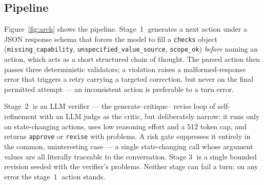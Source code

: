 \documentclass{article}
\begin{document}
\subsection{Pipeline}

Figure~\ref{fig:arch} shows the pipeline. Stage~\textcircled{1}
generates a next action under a JSON response schema
\cite{willard2023guided} that forces the
model to fill a \texttt{checks} object (\texttt{missing\_capability},
\texttt{unspecified\_value\_source}, \texttt{scope\_ok}) \emph{before}
naming an action, which acts as a short structured chain of thought.
The parsed action then passes three deterministic validators; a
violation raises a malformed-response error that triggers a retry
carrying a targeted correction, but never on the final permitted
attempt --- an inconsistent action is preferable to a turn error.

Stage~\textcircled{2} is an LLM verifier --- the generate--critique--%
revise loop of self-refinement
\cite{madaan2023selfrefine,shinn2023reflexion} with an LLM judge
\cite{zheng2023judging} as the critic, but deliberately narrow: it runs
only on state-changing actions, uses low reasoning effort and a 512
token cap, and returns \texttt{approve} or \texttt{revise} with
problems. A risk gate suppresses it entirely in the common,
uninteresting case --- a single state-changing call whose argument
values are all literally traceable to the conversation. Stage
\textcircled{3} is a single bounded revision seeded with the verifier's
problems. Neither stage can fail a turn: on any error the
stage~\textcircled{1} action stands.
\end{document}
